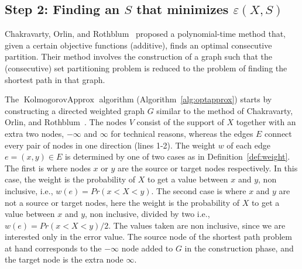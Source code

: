 \documentclass{article}
\DeclareMathOperator{\KlmApprox}{KolmogorovApprox}
\begin{document}
\subsection{Step 2: Finding an $S$ that minimizes $\varepsilon(X,S)$}
Chakravarty, Orlin, and Rothblum~\cite{chakravarty1982partitioning} proposed a polynomial-time method that, given a certain objective functions (additive), finds an optimal consecutive partition. Their method involves the construction of a graph such that the (consecutive) set partitioning problem is reduced to the problem of finding the shortest path in that graph.

The $\KlmApprox$ algorithm (Algorithm~\ref{alg:optapprox}) starts by constructing a directed weighted graph $G$ similar to the method of Chakravarty, Orlin, and Rothblum~\cite{chakravarty1982partitioning}. The nodes $V$ consist of the support of $X$ together with an extra two nodes, $-\infty$ and $\infty$ for technical reasons, whereas the edges $E$ connect every pair of nodes in one direction (lines 1-2). The weight $w$ of each edge $e=(x,y)\in E$ is determined by one of two cases as in Definition~\ref{def:weight}. The first is where nodes $x$ or $y$ are the source or target nodes respectively. In this case, the weight is the probability of $X$ to get a value between $x$ and $y$, non inclusive, i.e., $w(e)=Pr(x<X<y)$. The second case is where $x$ and $y$ are not a source or target nodes, here the weight is the probability of $X$ to get a value between $x$ and $y$, non inclusive, divided by two i.e., $w(e)=Pr(x<X<y)/2$. The values taken are non inclusive, since we are interested only in the error value. 
The source node of the shortest path problem at hand corresponds to the $-\infty$ node added to $G$ in the construction phase, and the target node is the extra node $\infty$.
\end{document}
